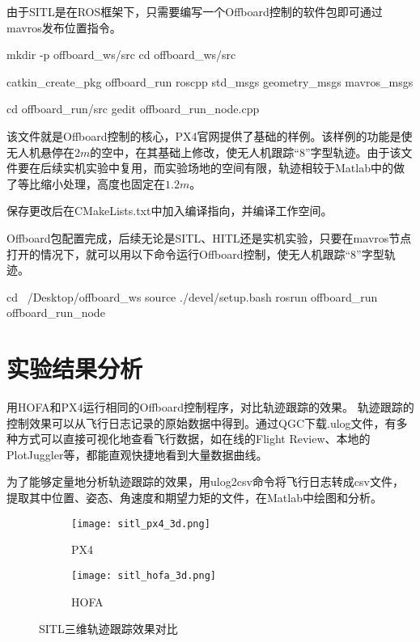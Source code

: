 由于SITL是在ROS框架下，只需要编写一个Offboard控制的软件包即可通过mavros发布位置指令。
\begin{codeblock}[language=C]
  mkdir -p offboard_ws/src
  cd offboard_ws/src

  catkin_create_pkg offboard_run roscpp std_msgs geometry_msgs mavros_msgs
  
  cd offboard_run/src
  gedit offboard_run_node.cpp
\end{codeblock}

该文件就是Offboard控制的核心，PX4官网提供了基础的样例\cite{Offboard}。该样例的功能是使无人机悬停在$2m$的空中，在其基础上修改，使无人机跟踪“8”字型轨迹。由于该文件要在后续实机实验中复用，而实验场地的空间有限，轨迹相较于Matlab中的做了等比缩小处理，高度也固定在$1.2m$。

保存更改后在CMakeLists.txt中加入编译指向，并编译工作空间。


  
Offboard包配置完成，后续无论是SITL、HITL还是实机实验，只要在mavros节点打开的情况下，就可以用以下命令运行Offboard控制，使无人机跟踪“8”字型轨迹。
\begin{codeblock}[language=C]
  cd ~/Desktop/offboard_ws
  source ./devel/setup.bash
  rosrun offboard_run offboard_run_node
\end{codeblock}


\section{实验结果分析}
用HOFA和PX4运行相同的Offboard控制程序，对比轨迹跟踪的效果。
轨迹跟踪的控制效果可以从飞行日志记录的原始数据中得到。通过QGC下载.ulog文件，有多种方式可以直接可视化地查看飞行数据，如在线的Flight Review、本地的PlotJuggler等，都能直观快捷地看到大量数据曲线。

为了能够定量地分析轨迹跟踪的效果，用ulog2csv命令将飞行日志转成csv文件，提取其中位置、姿态、角速度和期望力矩的文件，在Matlab中绘图和分析。

\begin{figure}[H]
  \centering
  \begin{subfigure}[b]{0.49\linewidth}
      \texttt{[image: sitl\_px4\_3d.png]}
      \caption{PX4}
  \end{subfigure}
  \hfill %
  \begin{subfigure}[b]{0.49\linewidth}
      \texttt{[image: sitl\_hofa\_3d.png]}
      \caption{HOFA}
  \end{subfigure}
  \caption{SITL三维轨迹跟踪效果对比}
\end{figure}

